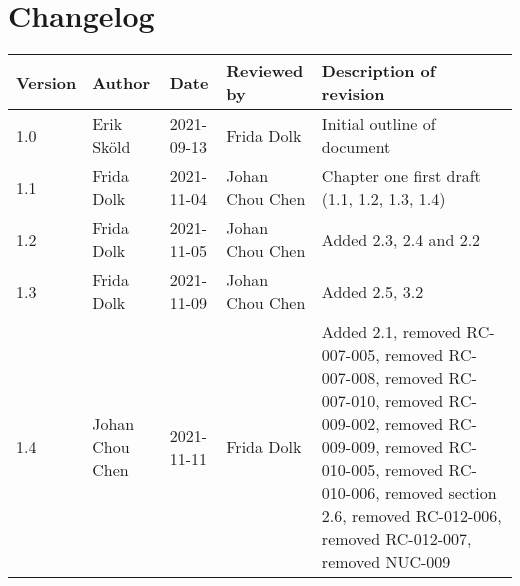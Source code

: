 \section{Changelog}

\label{sec:changelog}

\begin{table}[!ht]
\centering
\begin{tabular}{ | l | l | l | l | p{5cm} |}
    \hline
Version & Author & Date & Reviewed by & Description of revision \\
\hline
1.0 & Erik Sköld & 2021-09-13 & Frida Dolk & Initial outline of document\\ 
1.1 & Frida Dolk & 2021-11-04 & Johan Chou Chen & Chapter one first draft (1.1, 1.2, 1.3, 1.4) \\
1.2 & Frida Dolk & 2021-11-05 & Johan Chou Chen & Added 2.3, 2.4 and 2.2  \\
1.3 & Frida Dolk & 2021-11-09 & Johan Chou Chen & Added 2.5, 3.2  \\
1.4 & Johan Chou Chen & 2021-11-11 & Frida Dolk & Added 2.1, removed RC-007-005, removed RC-007-008, removed RC-007-010, removed RC-009-002, removed RC-009-009, removed RC-010-005, removed RC-010-006, removed section 2.6, removed RC-012-006, removed RC-012-007, removed NUC-009 \\
\hline
\end{tabular}
\end{table}
